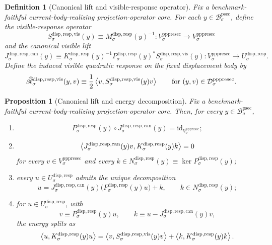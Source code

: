 \documentclass[11pt]{article}
\newcommand{\ProtoSectionBody}[1]{\mathcal B_{#1}^{\mathrm{psec}}}
\newcommand{\PrePreProtoSectionVertical}[1]{V_{#1}^{\mathrm{pppresec}}}
\newcommand{\PrePreProtoSectionResidualBody}[1]{\mathcal D_{#1}^{\mathrm{pppresec}}}
\newcommand{\CoreForcedBodyResponse}[1]{\widehat{\mathscr R}_{#1}^{\mathrm{disp,resp,vis}}}
\newcommand{\SubstrateCarrier}[1]{U_{#1}^{\mathrm{disp,resp}}}
\newcommand{\SubstrateProjection}[1]{P_{#1}^{\mathrm{disp,resp}}}
\newcommand{\SubstrateOperator}[1]{K_{#1}^{\mathrm{disp,resp}}}
\newcommand{\SubstrateKernel}[1]{N_{#1}^{\mathrm{disp,resp}}}
\newcommand{\SchurResponse}[1]{M_{#1}^{\mathrm{disp,resp}}}
\newcommand{\VisibleResponseOperator}[1]{S_{#1}^{\mathrm{disp,resp,vis}}}
\newcommand{\CanonicalLift}[1]{J_{#1}^{\mathrm{disp,resp,can}}}
\newtheorem{definition}{Definition}
\newtheorem{proposition}{Proposition}
\begin{document}
\begin{definition}[Canonical lift and visible-response operator]
\label{def:visible}
Fix a benchmark-faithful current-body-realizing projection-operator core. For each \(y\in\ProtoSectionBody{\sigma}\), define the \emph{visible-response operator}
\begin{equation}
\VisibleResponseOperator{\sigma}(y)
\equiv
\SchurResponse{\sigma}(y)^{-1}
:
\PrePreProtoSectionVertical{\sigma}\to\PrePreProtoSectionVertical{\sigma}
\label{eq:visibleop}
\end{equation}
and the \emph{canonical visible lift}
\begin{equation}
\CanonicalLift{\sigma}(y)
\equiv
\SubstrateOperator{\sigma}(y)^{-1}
\SubstrateProjection{\sigma}(y)^*
\VisibleResponseOperator{\sigma}(y)
:
\PrePreProtoSectionVertical{\sigma}\to\SubstrateCarrier{\sigma}.
\label{eq:canonical}
\end{equation}
Define the induced visible quadratic response on the fixed displacement body by
\begin{equation}
\CoreForcedBodyResponse{\sigma}(y,v)
\equiv
\frac{1}{2}
\ev{v,\VisibleResponseOperator{\sigma}(y)v}
\qquad
\text{for }
(y,v)\in\PrePreProtoSectionResidualBody{\sigma}.
\label{eq:response}
\end{equation}
\end{definition}

\begin{proposition}[Canonical lift and energy decomposition]
\label{prop:decomp}
Fix a benchmark-faithful current-body-realizing projection-operator core. Then, for every \(y\in\ProtoSectionBody{\sigma}\),
\begin{enumerate}
    \item
    \[
    \SubstrateProjection{\sigma}(y)\circ\CanonicalLift{\sigma}(y)
    =
    \mathrm{id}_{\PrePreProtoSectionVertical{\sigma}};
    \]
    \item
    \[
    \ev{
    \CanonicalLift{\sigma}(y)v,
    \SubstrateOperator{\sigma}(y)k
    }
    =
    0
    \]
    for every \(v\in\PrePreProtoSectionVertical{\sigma}\) and every \(k\in\SubstrateKernel{\sigma}(y)\equiv\ker\SubstrateProjection{\sigma}(y)\);
    \item every \(u\in\SubstrateCarrier{\sigma}\) admits the unique decomposition
    \[
    u
    =
    \CanonicalLift{\sigma}(y)\bigl(\SubstrateProjection{\sigma}(y)u\bigr)
    +
    k,
    \qquad
    k\in\SubstrateKernel{\sigma}(y);
    \]
    \item for \(u\in\SubstrateCarrier{\sigma}\), with
    \[
    v\equiv\SubstrateProjection{\sigma}(y)u,
    \qquad
    k\equiv u-\CanonicalLift{\sigma}(y)v,
    \]
    the energy splits as
    \begin{equation}
    \ev{u,\SubstrateOperator{\sigma}(y)u}
    =
    \ev{v,\VisibleResponseOperator{\sigma}(y)v}
    +
    \ev{k,\SubstrateOperator{\sigma}(y)k}.
    \label{eq:split}
    \end{equation}
\end{enumerate}
\end{proposition}
\end{document}
